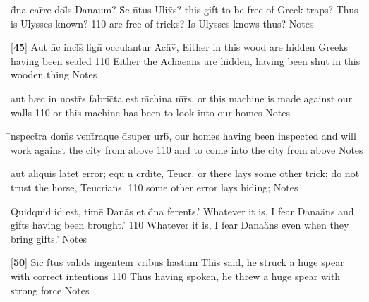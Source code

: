 \latline
  {d\={}na car\={}re dol\={\macron {\i}}s Danaum?  S\={\macron {\i}}c n\={}tus Ulix\={}s?}
  { this gift to be free of Greek traps?  Thus is Ulysses known? }
  {110}
  { are free of tricks?  Is Ulysses knows thus? }
  { Notes }


\latline
  {[\textbf{45}] Aut h\={}c incl\={}s\={\macron {\i}} lign\={} occulantur Ach\={\macron {\i}}v\={\macron {\i}},}
  { Either in this wood are hidden Greeks having been sealed }
  {110}
  { Either the Achaeans are hidden, having been shut in this wooden thing }
  { Notes }


\latline
  {aut h{\ae}c in nostr\={}s fabric\={}ta est m\={}china m\={}r\={}s,}
  { or this machine is made against our walls }
  {110}
  { or this machine has been to look into our homes  }
  { Notes }


\latline
  {\={\macron {\i}}nspect\={}ra dom\={}s vent\={}raque d\={}super urb\={\macron {\i}},}
  { our homes having been inspected and will work against the city from above }
  {110}
  { and to come into the city from above }
  { Notes }


\latline
  {aut aliquis latet error; equ\={} n\={} cr\={}dite, Teucr\={\macron {\i}}.}
  { or there lays some other trick; do not trust the horse, Teucrians. }
  {110}
  { some other error lays hiding; }
  { Notes }


\latline
  {Quidquid id est, time\={} Dana\={}s et d\={}na ferent\={\macron {\i}}s.'}
  { Whatever it is, I fear Dana\"ans and gifts having been brought.' }
  {110}
  { Whatever it is, I fear Dana\"ans even when they bring gifts.' }
  { Notes }


\latline
  {[\textbf{50}] S\={\i}c f\={}tus valid\={\macron {\i}}s ingentem v\={\macron {\i}}ribus hastam}
  { This said, he struck a huge spear with correct intentions }
  {110}
  { Thus having spoken, he threw a huge spear with strong force }
  { Notes }



